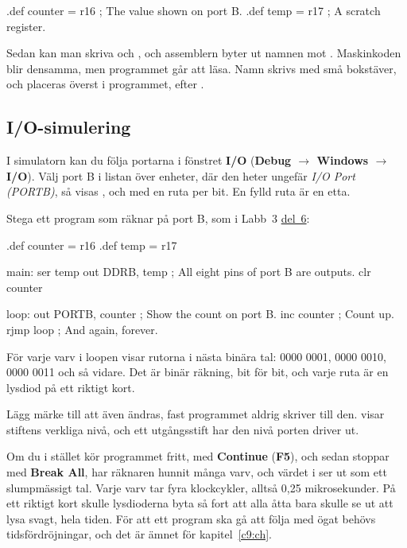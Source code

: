 \begin{asmcode}
.def counter = r16                  ; The value shown on port B.
.def temp = r17                     ; A scratch register.
\end{asmcode}

\noindent Sedan kan man skriva  och , och assemblern
byter ut namnen mot . Maskinkoden blir densamma, men programmet går att läsa. Namn skrivs
med små bokstäver, och  placeras överst i programmet, efter .

\subsection{I/O-simulering}
\label{c8:c7}
I simulatorn kan du följa portarna i fönstret \textbf{I/O} (\textbf{Debug $\rightarrow$ Windows
$\rightarrow$ I/O}). Välj port B i listan över enheter, där den heter ungefär \emph{I/O Port
(PORTB)}, så visas ,  och  med en ruta per bit. En fylld ruta är
en etta.

Stega ett program som räknar på port B, som i Labb~3 \hyperref[lab3:d6]{del~6}:

\begin{asmcode}
.def counter = r16
.def temp = r17

main:
    ser temp
    out DDRB, temp                  ; All eight pins of port B are outputs.
    clr counter

loop:
    out PORTB, counter              ; Show the count on port B.
    inc counter                     ; Count up.
    rjmp loop                       ; And again, forever.
\end{asmcode}

\noindent För varje varv i loopen visar rutorna i  nästa binära tal: 0000 0001, 0000
0010, 0000 0011 och så vidare. Det är binär räkning, bit för bit, och varje ruta är en lysdiod på
ett riktigt kort.

Lägg märke till att även \textbf{} ändras, fast programmet aldrig skriver till den.
 visar stiftens verkliga nivå, och ett utgångsstift har den nivå porten driver ut.

Om du i stället kör programmet fritt, med \textbf{Continue} (\textbf{F5}), och sedan stoppar med
\textbf{Break All}, har räknaren hunnit många varv, och värdet i  ser ut som ett
slumpmässigt tal. Varje varv tar fyra klockcykler, alltså 0,25 mikrosekunder. På ett riktigt kort
skulle lysdioderna byta så fort att alla åtta bara skulle se ut att lysa svagt, hela tiden. För att
ett program ska gå att följa med ögat behövs tidsfördröjningar, och det är ämnet för
kapitel~\ref{c9:ch}.

